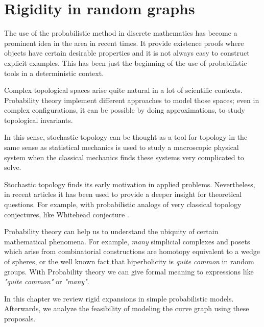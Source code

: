 
\chapter{Rigidity in random graphs} %

\label{Chapter2} %



The use of the probabilistic method in discrete mathematics has become a prominent idea in the area in recent times. It provide existence proofs where objects have certain desirable properties and it is not always easy to construct explicit examples. This has been just the beginning of the use of probabilistic tools in a deterministic context.

Complex topological spaces arise quite natural in a lot of scientific contexts. Probability theory implement different approaches to model those spaces; even in complex configurations, it can be possible by doing approximations, to study topological invariants. 

In this sense, stochastic topology can be thought as a tool for topology in the same sense as statistical mechanics is used to study a macroscopic physical system when the classical mechanics finds these systems very complicated to solve.

Stochastic topology finds its early motivation in applied problems. Nevertheless, in recent articles it has been used to provide a deeper insight for theoretical questions. For example, with probabilistic analogs of very classical topology conjectures, like Whitehead conjecture \cite{Costa15}.

Probability theory can help us to understand the ubiquity of certain mathematical phenomena. For example, \textit{many} simplicial complexes and posets which arise from combinatorial constructions are homotopy equivalent to a wedge of spheres, or the well known fact that hiperbolicity is \textit{quite common} in random groups. With Probability theory we can give formal meaning to expressions like \textit{"quite common"} or \textit{"many"}.

In this chapter we review rigid expansions in simple probabilistic models. Afterwards, we analyze the feasibility of modeling the curve graph using these proposals.

